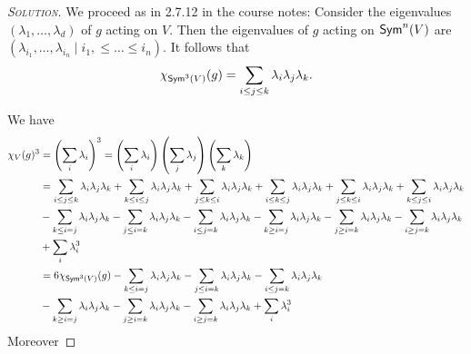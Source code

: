 \begin{proof}[{\scshape Solution}]
We proceed as in 2.7.12 in the course notes: Consider the eigenvalues $(\lambda_1, \ldots, \lambda_d)$ of $g$ acting on $V$. Then the eigenvalues of $g$ acting on $\mathsf{Sym}^n(V)$ are $(\lambda_{i_1}, \ldots, \lambda_{i_n} \mid i_1, \leq \ldots \leq i_n)$. It follows that
\[
  \chi_{\mathsf{Sym}^3(V)}(g) = \sum_{i \leq j \leq k}\lambda_i\lambda_j\lambda_k.
\]
\begin{comment}
We have
\[
\begin{aligned}
  \sum_{i \leq j \leq k}\lambda_i\lambda_j\lambda_k &= \sum_{i=j=k} \lambda_i\lambda_j\lambda_k + \sum_{i = j < k}\lambda_i\lambda_j\lambda_k + \sum_{i < j = k}\lambda_i\lambda_j\lambda_k +
  \sum_{i < j < k}\lambda_i\lambda_j\lambda_k \\
  &= \sum_{i} \lambda_i^3 + \sum_{i = j < k}\lambda_i\lambda_j\lambda_k + \sum_{i < j = k}\lambda_i\lambda_j\lambda_k +
  \sum_{i < j < k}\lambda_i\lambda_j\lambda_k.
\end{aligned}
\]
\end{comment}
We have
\[
\begin{aligned}
\chi_V(g)^3
&= \left(\sum_i{\lambda_i}\right)^3 = \left(\sum_i{\lambda_i}\right)\left(\sum_j{\lambda_j}\right)\left(\sum_k{\lambda_k}\right) \\
&= \sum_{i \leq j \leq k} \lambda_i\lambda_j\lambda_k + \sum_{k \leq i \leq j} \lambda_i\lambda_j\lambda_k + \sum_{j \leq k \leq i} \lambda_i\lambda_j\lambda_k +  \sum_{i \leq k \leq j} \lambda_i\lambda_j\lambda_k + \sum_{j \leq k \leq i} \lambda_i\lambda_j\lambda_k + \sum_{k \leq j \leq i} \lambda_i\lambda_j\lambda_k \\
&- \sum_{k \leq i = j} \lambda_i \lambda_j \lambda_k - \sum_{j \leq i = k} \lambda_i \lambda_j \lambda_k - \sum_{i \leq j = k} \lambda_i \lambda_j \lambda_k - \sum_{k \geq i = j} \lambda_i \lambda_j \lambda_k - \sum_{j \geq i = k} \lambda_i \lambda_j \lambda_k - \sum_{i \geq j = k} \lambda_i \lambda_j \lambda_k \\
&+ \sum_i\lambda_i^3 \\
&= 6\chi_{\mathsf{Sym}^3(V)}(g) -\sum_{k \leq i = j} \lambda_i \lambda_j \lambda_k - \sum_{j \leq i = k} \lambda_i \lambda_j \lambda_k - \sum_{i \leq j = k} \lambda_i \lambda_j \lambda_k \\
&- \sum_{k \geq i = j} \lambda_i \lambda_j \lambda_k - \sum_{j \geq i = k} \lambda_i \lambda_j \lambda_k - \sum_{i \geq j = k} \lambda_i \lambda_j \lambda_k + \sum_i\lambda_i^3
\end{aligned}
\]
Moreover

\end{proof}
